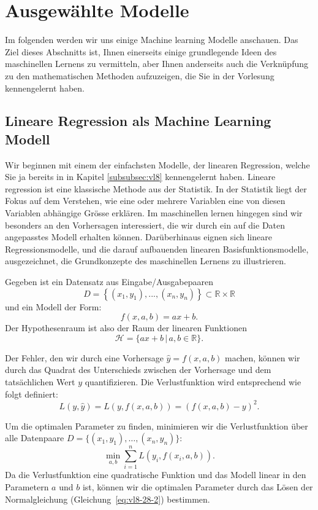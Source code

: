 \section{Ausgewählte Modelle}

Im folgenden werden wir uns einige Machine learning Modelle anschauen. Das Ziel dieses Abschnitts ist, 
Ihnen einerseits einige grundlegende Ideen des maschinellen Lernens zu vermitteln, aber Ihnen anderseits auch 
die Verknüpfung zu den mathematischen Methoden aufzuzeigen, die Sie in der Vorlesung kennengelernt haben.

\subsection{Lineare Regression als Machine Learning Modell}

Wir beginnen mit einem der einfachsten Modelle, der linearen Regression, welche Sie ja bereits in in Kapitel \ref{subsubsec:vl8}
kennengelernt haben. Lineare regression ist eine klassische Methode aus der Statistik. In der Statistik liegt der Fokus auf dem Verstehen, wie eine oder mehrere Variablen eine von diesen Variablen abhängige Grösse erklären. Im maschinellen lernen hingegen sind wir besonders an den Vorhersagen interessiert, die wir durch ein auf die Daten angepasstes Modell erhalten können. 
Darüberhinaus eignen sich lineare Regressionsmodelle, und die darauf aufbauenden linearen Basisfunktionsmodelle, ausgezeichnet, die Grundkonzepte des maschinellen Lernens zu illustrieren. 

Gegeben ist ein Datensatz aus Eingabe/Ausgabepaaren 
\[
    D = \left\{ (x_1,y_1),...,(x_n,y_n) \right\} \subset \mathbb{R} \times \mathbb{R}
\]
und ein Modell der Form:
\[
    f(x, a, b) = ax + b.
\]
Der Hypothesenraum ist also der Raum der linearen Funktionen 
\[
\mathcal{H} = \{a x + b \,| \,a, b \in \mathbb{R}\}.    
\]

Der Fehler, den wir durch eine Vorhersage $\hat{y} =f(x, a, b)$ machen, können wir durch das 
Quadrat des Unterschieds zwischen der Vorhersage und dem tatsächlichen Wert $y$ quantifizieren.
Die Verlustfunktion wird entsprechend wie folgt definiert:
\[
    L(y, \hat{y}) = L(y, f(x, a,b))=  (f(x, a, b) - y)^2.
\]

Um die optimalen Parameter zu finden, minimieren wir die Verlustfunktion über alle Datenpaare $D=\{(x_1, y_1), \ldots, (x_n, y_n)\}$:
\[
    \min_{a, b} \sum_{i=1}^n L(y_i, f(x_i, a, b)).
\]
Da die Verlustfunktion eine quadratische Funktion und das
Modell linear in den Parametern $a$ und $b$ ist, können wir 
die optimalen Parameter durch das Lösen der Normalgleichung (Gleichung~\ref{eq:vl8-28-2}) bestimmen.

